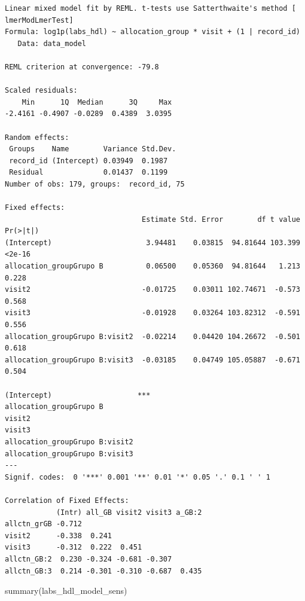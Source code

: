 \documentclass[
  letterpaper,
  DIV=11,
  numbers=noendperiod]{scrartcl}
\newenvironment{Shaded}{\begin{snugshade}}{\end{snugshade}}
\newcommand{\FunctionTok}[1]{\textcolor[rgb]{0.28,0.35,0.67}{#1}}
\newcommand{\NormalTok}[1]{\textcolor[rgb]{0.00,0.23,0.31}{#1}}
\begin{document}
\begin{verbatim}
Linear mixed model fit by REML. t-tests use Satterthwaite's method [
lmerModLmerTest]
Formula: log1p(labs_hdl) ~ allocation_group * visit + (1 | record_id)
   Data: data_model

REML criterion at convergence: -79.8

Scaled residuals: 
    Min      1Q  Median      3Q     Max 
-2.4161 -0.4907 -0.0289  0.4389  3.0395 

Random effects:
 Groups    Name        Variance Std.Dev.
 record_id (Intercept) 0.03949  0.1987  
 Residual              0.01437  0.1199  
Number of obs: 179, groups:  record_id, 75

Fixed effects:
                                Estimate Std. Error        df t value Pr(>|t|)
(Intercept)                      3.94481    0.03815  94.81644 103.399   <2e-16
allocation_groupGrupo B          0.06500    0.05360  94.81644   1.213    0.228
visit2                          -0.01725    0.03011 102.74671  -0.573    0.568
visit3                          -0.01928    0.03264 103.82312  -0.591    0.556
allocation_groupGrupo B:visit2  -0.02214    0.04420 104.26672  -0.501    0.618
allocation_groupGrupo B:visit3  -0.03185    0.04749 105.05887  -0.671    0.504
                                  
(Intercept)                    ***
allocation_groupGrupo B           
visit2                            
visit3                            
allocation_groupGrupo B:visit2    
allocation_groupGrupo B:visit3    
---
Signif. codes:  0 '***' 0.001 '**' 0.01 '*' 0.05 '.' 0.1 ' ' 1

Correlation of Fixed Effects:
            (Intr) all_GB visit2 visit3 a_GB:2
allctn_grGB -0.712                            
visit2      -0.338  0.241                     
visit3      -0.312  0.222  0.451              
allctn_GB:2  0.230 -0.324 -0.681 -0.307       
allctn_GB:3  0.214 -0.301 -0.310 -0.687  0.435
\end{verbatim}

\begin{Shaded}
\begin{Highlighting}[]
\FunctionTok{summary}\NormalTok{(labs\_hdl\_model\_sens)}
\end{Highlighting}
\end{Shaded}
\end{document}
